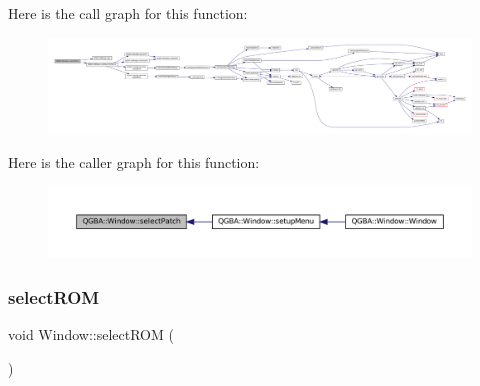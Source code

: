 Here is the call graph for this function\+:
\nopagebreak
\begin{figure}[H]
\begin{center}
\leavevmode
\includegraphics[width=350pt]{class_q_g_b_a_1_1_window_a46e83ed0f628884840257d9534a6fa29_cgraph}
\end{center}
\end{figure}
Here is the caller graph for this function\+:
\nopagebreak
\begin{figure}[H]
\begin{center}
\leavevmode
\includegraphics[width=350pt]{class_q_g_b_a_1_1_window_a46e83ed0f628884840257d9534a6fa29_icgraph}
\end{center}
\end{figure}
\mbox{\label{class_q_g_b_a_1_1_window_a11460c0780140a4c0ebac4d51b4f1a5d}} 
\subsubsection{\texorpdfstring{select\+R\+OM}{selectROM}}
{\footnotesize\ttfamily void Window\+::select\+R\+OM (\begin{DoxyParamCaption}{ }\end{DoxyParamCaption})\hspace{0.3cm}{\ttfamily [slot]}}

